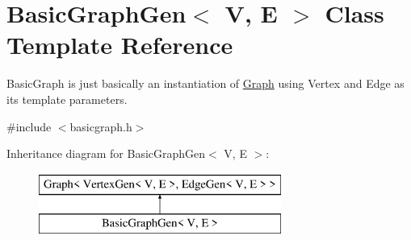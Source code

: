 \hypertarget{classBasicGraphGen}{}\section{Basic\+Graph\+Gen$<$ V, E $>$ Class Template Reference}
\label{classBasicGraphGen}


Basic\+Graph is just basically an instantiation of \mbox{\hyperlink{classGraph}{Graph}} using Vertex and Edge as its template parameters.  




{\ttfamily \#include $<$basicgraph.\+h$>$}

Inheritance diagram for Basic\+Graph\+Gen$<$ V, E $>$\+:\begin{figure}[H]
\begin{center}
\leavevmode
\includegraphics[height=2.000000cm]{classBasicGraphGen}
\end{center}
\end{figure}
